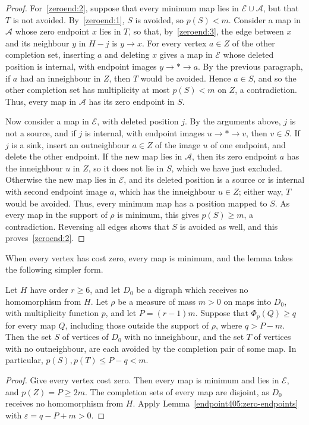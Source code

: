 \begin{proof}
For~\ref{zeroend:2}, suppose that every minimum map lies in $\mathcal E\cup\mathcal A$, but that $T$ is not avoided. By~\ref{zeroend:1}, $S$ is avoided, so $p(S)<m$.
Consider a map in $\mathcal A$ whose zero endpoint $x$ lies in $T$, so that, by~\ref{zeroend:3}, the edge between $x$ and its neighbour $y$ in $H-j$ is $y\to x$. For every vertex $a\in Z$ of the other completion set, inserting $a$ and deleting $x$ gives a map in $\mathcal E$ whose deleted position is internal, with endpoint images $y\to *\to a$. By the previous paragraph, if $a$ had an inneighbour in $Z$, then $T$ would be avoided. Hence $a\in S$, and so the other completion set has multiplicity at most $p(S)<m$ on $Z$, a contradiction. Thus, every map in $\mathcal A$ has its zero endpoint in $S$.

Now consider a map in $\mathcal E$, with deleted position $j$. By the arguments above, $j$ is not a source, and if $j$ is internal, with endpoint images $u\to*\to v$, then $v\in S$. If $j$ is a sink, insert an outneighbour $a\in Z$ of the image $u$ of one endpoint, and delete the other endpoint. If the new map lies in $\mathcal A$, then its zero endpoint $a$ has the inneighbour $u$ in $Z$, so it does not lie in $S$, which we have just excluded. Otherwise the new map lies in $\mathcal E$, and its deleted position is a source or is internal with second endpoint image $a$, which has the inneighbour $u\in Z$; either way, $T$ would be avoided.
Thus, every minimum map has a position mapped to $S$. As every map in the support of $\rho$ is minimum, this gives $p(S)\ge m$, a contradiction. Reversing all edges shows that $S$ is avoided as well, and this proves~\ref{zeroend:2}.
\end{proof}

When every vertex has cost zero, every map is minimum, and the lemma takes the following simpler form.

\begin{lemma}\label{base392:extremes}
Let $H$ have order $r\ge6$, and let $D_0$ be a digraph which receives no homomorphism from $H$.
Let $\rho$ be a measure of mass $m>0$ on maps into $D_0$, with multiplicity function
$p$, and let $P=(r-1)m$. Suppose that $\Phi_p(Q)\ge q$ for every map $Q$, including those outside the support of $\rho$, where $q>P-m$.
Then the set $S$ of vertices of $D_0$ with no inneighbour, and the set $T$ of vertices with no outneighbour, are each avoided by the completion pair of some map. In particular,
$p(S),p(T)\le P-q<m$.
\end{lemma}
\begin{proof}
Give every vertex cost zero. Then every map is minimum
and lies in $\mathcal E$, and $p(Z)=P\ge2m$.
The completion sets of every map are disjoint, as $D_0$ receives no homomorphism from $H$. Apply Lemma~\ref{endpoint405:zero-endpoints}
with $\varepsilon=q-P+m>0$.
\end{proof}

